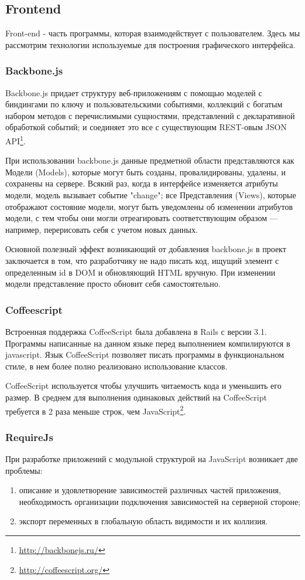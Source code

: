 \subsection{Frontend}
Front-end - часть программы, которая взаимодействует с пользователем. Здесь мы
рассмотрим технологии используемые для построения графического интерфейса.

\subsubsection{Backbone.js}
Backbone.js придает структуру веб-приложениям с помощью моделей с биндингами по
ключу и пользовательскими событиями, коллекций с богатым набором методов с
перечислимыми сущностями, представлений с декларативной обработкой событий; и
соединяет это все с существующим REST-овым JSON API\footnote{
	\url{http://backbonejs.ru/}
}.

При использовании backbone.js данные предметной области представляются как
Модели (Models), которые могут быть созданы, провалидированы, удалены, и
сохранены на сервере. Всякий раз, когда в интерфейсе изменяется атрибуты модели,
модель вызывает событие "change"; все Представления (Views), которые отображают
состояние модели, могут быть уведомлены об изменении атрибутов модели, с тем
чтобы они могли отреагировать соответствующим образом — например, перерисовать
себя с учетом новых данных.

Основной полезный эффект возникающий от добавления backbone.js в проект
заключается в том, что разработчику не надо писать код, ищущий элемент с
определенным id в DOM и обновляющий HTML вручную. При изменении модели
представление просто обновит себя самостоятельно.

\subsubsection{Coffeescript}
Встроенная поддержка CoffeeScript была добавлена в Rails с версии 3.1. Программы
написанные на данном языке перед выполнением компилируются в javascript. Язык
CoffeeScript позволяет писать программы в функциональном стиле, в нем более
полно реализовано использование классов.

CoffeeScript используется чтобы улучшить читаемость кода и уменьшить его размер.
В среднем для выполнения одинаковых действий на CoffeeScript требуется в 2 раза
меньше строк, чем JavaScript\footnote{
	\url{http://coffeescript.org/}
}.

\subsubsection{RequireJs}
При разработке приложений с модульной структурой на JavaScript возникает две
проблемы:
\begin{enumerate}
  \item описание и удовлетворение зависимостей различных частей приложения, необходимость организации подключения зависимостей на серверной стороне;
  \item экспорт переменных в глобальную область видимости и их коллизия. 
\end{enumerate}

